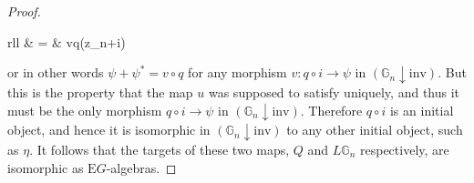\begin{proof}
\begin{eq*}
\begin{array}{rll}
			& = & vq(z_{n+i})
		\end{array}
\end{eq*}
or in other words $\psi + \psi^* = v \circ q$ for any morphism $v: q \circ i \to \psi$ in $(\mathbb{G}_n \downarrow \mathrm{inv})$. But this is the property that the map $u$ was supposed to satisfy uniquely, and thus it must be the only morphism $q \circ i \to \psi$ in $(\mathbb{G}_n \downarrow \mathrm{inv})$. Therefore $q \circ i$ is an initial object, and hence it is isomorphic in $(\mathbb{G}_n \downarrow \mathrm{inv})$ to any other initial object, such as $\eta$. It follows that the targets of these two maps, $Q$ and $L\mathbb{G}_n$ respectively, are isomorphic as $\mathrm{E}G$-algebras.
\end{proof}











